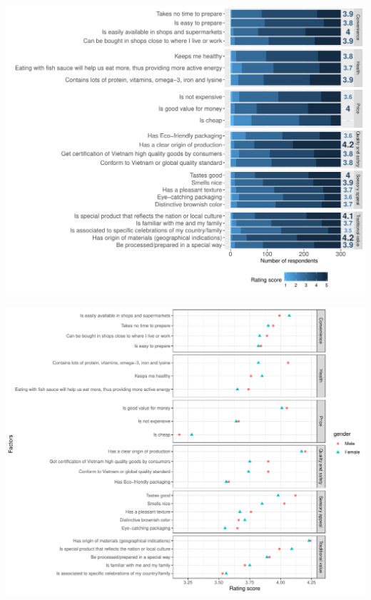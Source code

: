\documentclass[]{article}
\begin{document}
\includegraphics{Consumer-attitude-towards-fish-sauce-products_files/figure-latex/unnamed-chunk-15-1.pdf}

\includegraphics{Consumer-attitude-towards-fish-sauce-products_files/figure-latex/unnamed-chunk-16-1.pdf}
\end{document}

